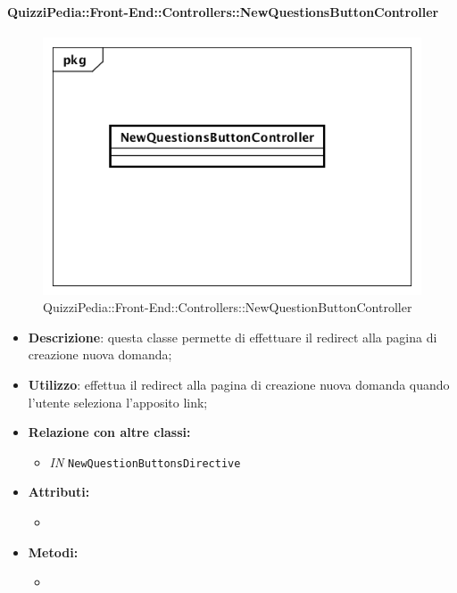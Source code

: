 \paragraph{QuizziPedia::Front-End::Controllers::NewQuestionsButtonController}
\begin{figure}
	\centering
	\includegraphics[scale=0.45]{UML/Classi/Front-End/QuizziPedia_Front-end_Controller_NewQuestionsButtonController.png}
	\caption{QuizziPedia::Front-End::Controllers::NewQuestionButtonController}
\end{figure}
\begin{itemize}
	\item \textbf{Descrizione}: questa classe permette di effettuare il redirect alla pagina di creazione nuova domanda;
	\item \textbf{Utilizzo}: effettua il redirect alla pagina di creazione nuova domanda quando l'utente seleziona l'apposito link;
	\item \textbf{Relazione con altre classi:}
	\begin{itemize}
		\item \textit{IN} \texttt{NewQuestionButtonsDirective} 
	\end{itemize}
	\item \textbf{Attributi:}
	\begin{itemize}
		\item 
	\end{itemize}
	\item \textbf{Metodi:}
	\begin{itemize}
		\item 
	\end{itemize}
\end{itemize}

